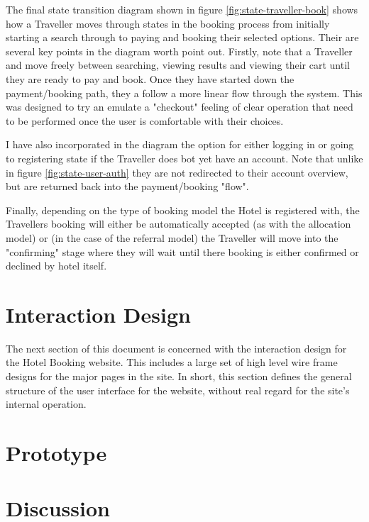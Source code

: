 \documentclass{article}
\begin{document}
The final state transition diagram shown in figure \ref{fig:state-traveller-book} shows how a Traveller moves through states in the booking process from initially starting a search through to paying and booking their selected options. Their are several key points in the diagram worth point out. Firstly, note that a Traveller and move freely between searching, viewing results and viewing their cart until they are ready to pay and book. Once they have started down the payment/booking path, they a follow a more linear flow through the system. This was designed to try an emulate a "checkout" feeling of clear operation that need to be performed once the user is comfortable with their choices.

I have also incorporated in the diagram the option for either logging in or going to registering state if the Traveller does bot yet have an account. Note that unlike in figure \ref{fig:state-user-auth} they are not redirected to their account overview, but are returned back into the payment/booking "flow".

Finally, depending on the type of booking model the Hotel is registered with, the Travellers booking will either be automatically accepted (as with the allocation model) or  (in the case of the referral model) the Traveller will move into the "confirming" stage where they will wait until there booking is either confirmed or declined by hotel itself.

\section{Interaction Design}
The next section of this document is concerned with the interaction design for the  Hotel Booking website. This includes a large set of high level wire frame designs for the major pages in the site. In short, this section defines the general structure of the user interface for the website, without real regard for the site's internal operation.



\section{Prototype}


\section{Discussion}
\end{document}
